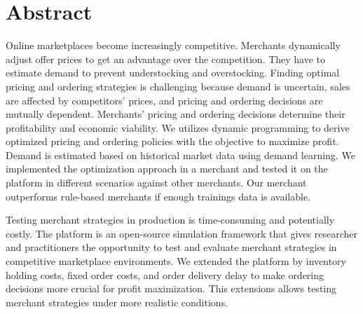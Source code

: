 \chapter*{Abstract}
Online marketplaces become increasingly competitive.
Merchants dynamically adjust offer prices to get an advantage over the competition.
They have to estimate demand to prevent understocking and overstocking.
Finding optimal pricing and ordering strategies is challenging because demand is uncertain, sales are affected by competitors' prices, and pricing and ordering decisions are mutually dependent.
Merchants' pricing and ordering decisions determine their profitability and economic viability.
We utilizes dynamic programming to derive optimized pricing and ordering policies with the objective to maximize profit.
Demand is estimated based on historical market data using demand learning.
We implemented the optimization approach in a merchant and tested it on the \pricewars platform in different scenarios against other merchants.
Our merchant outperforms rule-based merchants if enough trainings data is available.

Testing merchant strategies in production is time-consuming and potentially costly.
The \pricewars platform is an open-source simulation framework that gives researcher and practitioners the opportunity to test and evaluate merchant strategies in competitive marketplace environments.
We extended the platform by inventory holding costs, fixed order costs, and order delivery delay to make ordering decisions more crucial for profit maximization.
This extensions allows testing merchant strategies under more realistic conditions.